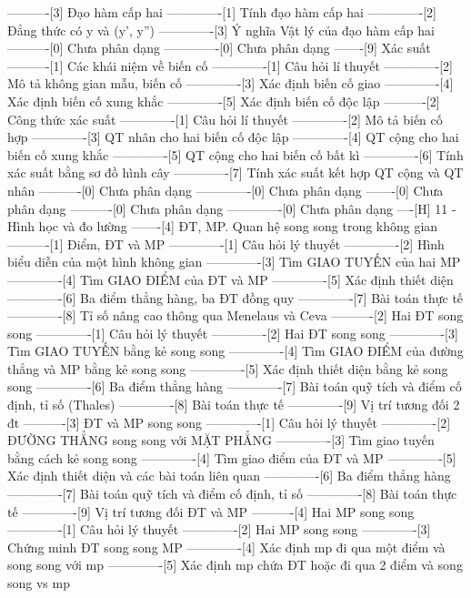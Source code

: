 ----------[3] Đạo hàm cấp hai
-------------[1] Tính đạo hàm cấp hai
-------------[2] Đẳng thức có y và (y', y'')
-------------[3] Ý nghĩa Vật lý của đạo hàm cấp hai
----------[0] Chưa phân dạng
-------------[0] Chưa phân dạng
-------[9] Xác suất
----------[1] Các khái niệm về biến cố
-------------[1] Câu hỏi lí thuyết
-------------[2] Mô tả không gian mẫu, biến cố
-------------[3] Xác định biến cố giao
-------------[4] Xác định biến cố xung khắc
-------------[5] Xác định biến cố độc lập
----------[2] Công thức xác suất
-------------[1] Câu hỏi lí thuyết
-------------[2] Mô tả biến cố hợp
-------------[3] QT nhân cho hai biến cố độc lập
-------------[4] QT cộng cho hai biến cố xung khắc
-------------[5] QT cộng cho hai biến cố bất kì
-------------[6] Tính xác suất bằng sơ đồ hình cây
-------------[7] Tính xác suất kết hợp QT cộng và QT nhân
----------[0] Chưa phân dạng
-------------[0] Chưa phân dạng
-------[0] Chưa phân dạng
----------[0] Chưa phân dạng
-------------[0] Chưa phân dạng
----[H] 11 - Hình học và đo lường
-------[4] ĐT, MP. Quan hệ song song trong không gian
----------[1] Điểm, ĐT và MP
-------------[1] Câu hỏi lý thuyết
-------------[2] Hình biểu diễn của một hình không gian
-------------[3] Tìm GIAO TUYẾN của hai MP
-------------[4] Tìm GIAO ĐIỂM của ĐT và MP
-------------[5] Xác định thiết diện
-------------[6] Ba điểm thẳng hàng, ba ĐT đồng quy
-------------[7] Bài toán thực tế
-------------[8] Tỉ số nâng cao thông qua Menelaus và Ceva
----------[2] Hai ĐT song song
-------------[1] Câu hỏi lý thuyết
-------------[2] Hai ĐT song song
-------------[3] Tìm GIAO TUYẾN bằng kẻ song song
-------------[4] Tìm GIAO ĐIỂM của đường thẳng và MP bằng kẻ song song
-------------[5] Xác định thiết diện bằng kẻ song song
-------------[6] Ba điểm thẳng hàng
-------------[7] Bài toán quỹ tích và điểm cố định, tỉ số (Thales)
-------------[8] Bài toán thực tế
-------------[9] Vị trí tương đối 2 đt
----------[3] ĐT và MP song song
-------------[1] Câu hỏi lý thuyết
-------------[2] ĐƯỜNG THẲNG song song với MẶT PHẲNG
-------------[3] Tìm giao tuyến bằng cách kẻ song song
-------------[4] Tìm giao điểm của ĐT và MP
-------------[5] Xác định thiết diện và các bài toán liên quan
-------------[6] Ba điểm thẳng hàng
-------------[7] Bài toán quỹ tích và điểm cố định, tỉ số
-------------[8] Bài toán thực tế
-------------[9] Vị trí tương đối ĐT và MP
----------[4] Hai MP song song
-------------[1] Câu hỏi lý thuyết
-------------[2] Hai MP song song
-------------[3] Chứng minh ĐT song song MP
-------------[4] Xác định mp đi qua một điểm và song song với mp
-------------[5] Xác định mp chứa ĐT hoặc đi qua 2 điểm và song song vs mp
